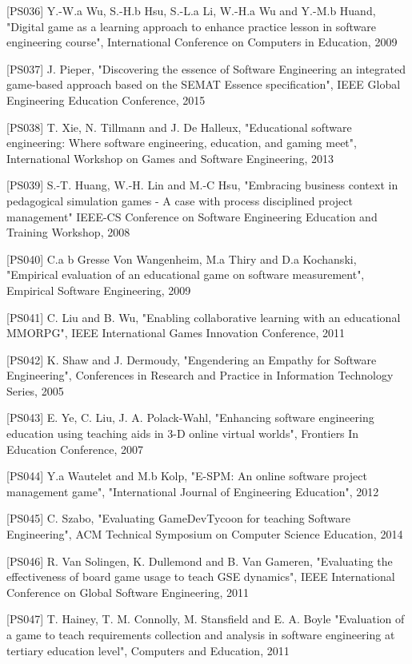 [PS036]	Y.-W.a Wu, S.-H.b Hsu, S.-L.a Li, W.-H.a Wu and Y.-M.b Huand, "Digital game as a learning approach to enhance practice lesson in software engineering course", International Conference on Computers in Education, 2009

[PS037]	J. Pieper, "Discovering the essence of Software Engineering an integrated game-based approach based on the SEMAT Essence specification", IEEE Global Engineering Education Conference, 2015

[PS038]	T. Xie, N. Tillmann and J. De Halleux, "Educational software engineering: Where software engineering, education, and gaming meet", International Workshop on Games and Software Engineering, 2013

[PS039]	S.-T. Huang, W.-H. Lin and M.-C Hsu, "Embracing business context in pedagogical simulation games - A case with process disciplined project management" IEEE-CS Conference on Software Engineering Education and Training Workshop, 2008

[PS040]	C.a b Gresse Von Wangenheim, M.a Thiry and D.a Kochanski, "Empirical evaluation of an educational game on software measurement", Empirical Software Engineering, 2009

[PS041]	C. Liu and B. Wu, "Enabling collaborative learning with an educational MMORPG", IEEE International Games Innovation Conference, 2011

[PS042]	K. Shaw and J. Dermoudy, "Engendering an Empathy for Software Engineering", Conferences in Research and Practice in Information Technology Series, 2005

[PS043]	E. Ye, C. Liu, J. A. Polack-Wahl, "Enhancing software engineering education using teaching aids in 3-D online virtual worlds", Frontiers In Education Conference, 2007

[PS044]	Y.a Wautelet and M.b Kolp, "E-SPM: An online software project management game", "International Journal of Engineering Education", 2012

[PS045]	C. Szabo, "Evaluating GameDevTycoon for teaching Software Engineering", ACM Technical Symposium on Computer Science Education, 2014

[PS046]	R. Van Solingen, K. Dullemond and B. Van Gameren, "Evaluating the effectiveness of board game usage to teach GSE dynamics", IEEE International Conference on Global Software Engineering, 2011

[PS047]	T. Hainey, T. M. Connolly, M. Stansfield and E. A. Boyle "Evaluation of a game to teach requirements collection and analysis in software engineering at tertiary education level", Computers and Education, 2011

